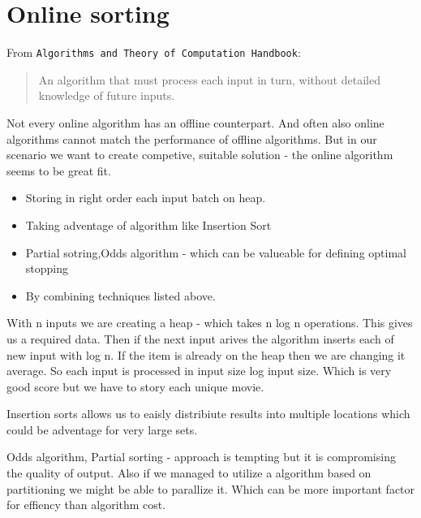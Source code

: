 \section*{Online sorting}
From \texttt{Algorithms and Theory of Computation Handbook}:
\begin{quote}
An algorithm that must process each input in turn, without detailed knowledge
of future inputs.
\end{quote}

Not every online algorithm has an offline counterpart. And often also online
algorithms cannot match the performance of offline algorithms.
But in our scenario we want to create competive, suitable solution - the online
algorithm seems to be great fit.

\begin{itemize}
	\item{Storing in right order each input batch on heap.}
	\item{Taking adventage of algorithm like Insertion Sort}
	\item{Partial sotring,Odds algorithm - which can be valueable for defining optimal stopping}
  \item{By combining techniques listed above. }
\end{itemize}

With n inputs we are creating a heap - which takes n log n operations. This gives
us a required data. Then if the next input arives the algorithm inserts each
of new input with log n. If the item is already on the heap then we are changing
it average. So each input is processed in input size log input size.
Which is very good score but we have to story each unique movie.

Insertion sorts allows us to eaisly distribiute results into multiple locations
which could be adventage for very large sets.

Odds algorithm, Partial sorting - approach is tempting but it is compromising
the quality of output. Also if we managed to utilize a algorithm based on
partitioning we might be able to parallize it. Which can be more important factor
for effiency than algorithm cost.
